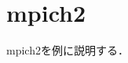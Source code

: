 \begin{comment}
$ ./configure --prefix=/usr/local/mpich2
              --enable-error-checking=no
              --enable-error-messages=none
              --enable-timing=none
              --enable-g=none
              --enable-fast
              --enable-ndebug
              --enable-f77
              --enable-f90
              --enable-cxx
              --enable-romio
              --enable-threads=single
              --with-thread-package=posix
\end{verbatim}
\verb|              --enable-sharedlibs=gcc|\footnote{Mac OSXの場合は\quad \verb|--enable-sharedlibs=osx-gcc|
}

\begin{verbatim}
$ make
$ sudo make install

$ cd /usr/local
$ sudo ln -s mpich2 mpich
\end{verbatim}
}
\end{indentation}
\vspace{\baselineskip}

\item トラブルシューティング
{\small
\begin{itemize}
\item Windows\index{Windows}でSP3をインストールしてある場合\\
Windows Installer 3.1 Redistibutable(v2)-日本語をインストールする場合に，「このシステムのService Packが適用しようとしている更新より新しいバージョンであることが検出されました。この更新をインストールする必要はありません」とメッセージがでて，インストールされていないかもしれないがインストール自体は完了している．
\vspace{\baselineskip}
\item gccのエラー\\
\verb|$ export CC=gcc4|\quad では、C compilerが見つからないというエラーが出る場合がある．
\begin{verbatim}
checking for gcc... gcc4
checking for C compiler default output file name...
configure: error: C compiler cannot create executables
\end{verbatim}
この場合，gccを用いる．
\vspace{\baselineskip}
\end{itemize}

}
\end{enumerate}
\end{comment}

\section{mpich2}
\label{sec:mpich2}
mpich2を例に説明する．

